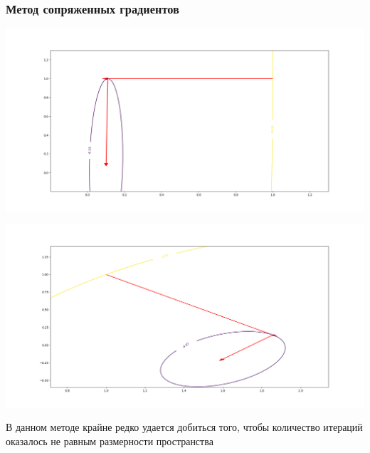 \documentclass[english]{article}
\begin{document}
\subsubsection{Метод сопряженных градиентов}
\begin{center}
  \includegraphics[scale=0.3]{plots/traectories/conjugate_gradient_1.png}
\end{center}
\begin{center}
  \includegraphics[scale=0.3]{plots/traectories/conjugate_gradient_2.png}
\end{center}

В данном методе крайне редко удается добиться того, чтобы количество
итераций оказалось не равным размерности пространства
\end{document}
